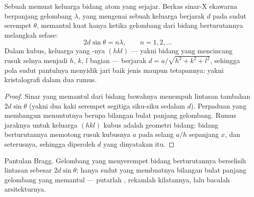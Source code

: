 \begin{proposition}\label{prop:b3:crystalline-solids:bragg}
Sebuah  memuat keluarga bidang atom yang sejajar. Berkas sinar-X
ekawarna berpanjang gelombang $\lambda$, yang mengenai sebuah keluarga
berjarak $d$ pada sudut serempet $\theta$, memantul kuat hanya
ketika gelombang dari bidang berturutannya melangkah sefase:
\[
2d\sin\theta = n\lambda , \qquad n = 1, 2, \dots
\]
Dalam  kubus, keluarga yang \emph{}-nya
$(hkl)$ --- yakni bidang yang mencincang rusuk selnya menjadi $h$, $k$, $l$ bagian
--- berjarak $d = a/\sqrt{h^2 + k^2 + l^2}$, sehingga pola
sudut pantulnya menyidik jari baik jenis  maupun
tetapannya: yakni kristalografi dalam dua rumus.
\end{proposition}

\begin{proof}
Sinar yang memantul dari bidang bawahnya menempuh lintasan tambahan $2d
\sin\theta$ (yakni dua kaki serempet segitiga siku-siku sedalam $d$).
Perpaduan yang membangun menuntutnya berupa bilangan bulat
panjang gelombang. Rumus jaraknya untuk keluarga $(hkl)$ kubus adalah
geometri bidang: bidang berturutannya memotong rusuk kubusnya $a$ pada
selang $a/h$ sepanjang $x$, dan seterusnya, sehingga diperoleh $d$ yang dinyatakan itu.
\end{proof}

\begin{omfigure}

{\small Pantulan Bragg. Gelombang yang menyerempet bidang berturutannya
berselisih lintasan sebesar $2d\sin\theta$; hanya sudut yang membuatnya
bilangan bulat panjang gelombang yang memantul --- putarlah ,
rekamlah kilatannya, lalu bacalah arsitekturnya.}
\end{omfigure}

